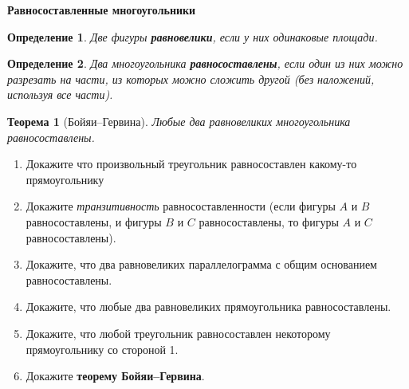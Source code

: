 \documentclass{article}
\newtheorem{theorem}{Теорема}
\newtheorem{definition}{Определение}
\begin{document}
\large
	
\begin{center}
	\textbf{Равносоставленные многоугольники}
\end{center}

\begin{definition}
	Две фигуры \textbf{равновелики}, если у них одинаковые площади.
\end{definition}

\begin{definition}
	Два многоугольника \textbf{равносоставлены}, если один из них можно разрезать на части, из которых можно сложить другой (без наложений, используя все части).
\end{definition}

\begin{theorem}[Бойяи–Гервина]
	Любые два равновеликих многоугольника равносоставлены.
\end{theorem}

\begin{enumerate}[label*=\protect\fbox{\arabic{enumi}}]
	
	
\item Докажите что произвольный треугольник равносоставлен какому-то прямоугольнику

\item Докажите \textit{транзитивность} равносоставленности (если фигуры $A$ и $B$ равносоставлены, и фигуры $B$ и $C$ равносоставлены, то фигуры $A$ и $C$ равносоставлены).

\item Докажите, что два равновеликих параллелограмма с общим основанием равносоставлены.

\item Докажите, что любые два равновеликих прямоугольника равносоставлены.

\item Докажите, что любой треугольник равносоставлен некоторому прямоугольнику со стороной 1.
%
%	
%	
%	

\item Докажите \textbf{теорему Бойяи–Гервина}.

\end{enumerate}
\end{document}
